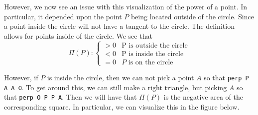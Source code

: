 \documentclass[reqno]{amsart}
\DeclareMathOperator{\1}{\textbf{1}}
\begin{document}
\begin{center}
\end{center}


However, we now see an issue with this visualization of the power of a point. In
particular, it depended upon the point $P$ being located outside of the circle.
Since a point inside the circle will not have a tangent to the circle. 
The definition allows for points inside of the circle. We see
that
\[
\Pi(P):\begin{cases}
    >0 & \text{P is outside the circle}\\
    <0 & \text{P is inside the circle}\\
    =0&\text{$P$ is on the circle}
\end{cases}
\]

However, if $P$ is inside the circle, then we can not pick a point $A$ so that \verb|perp P A A O|. 
To get around this, we can still make a right triangle, but picking $A$ so that \verb|perp O P P A|. 
Then we will have that $\Pi(P)$ is the negative area of the corresponding square. 
In particular, we can visualize this in the figure below.
\end{document}
